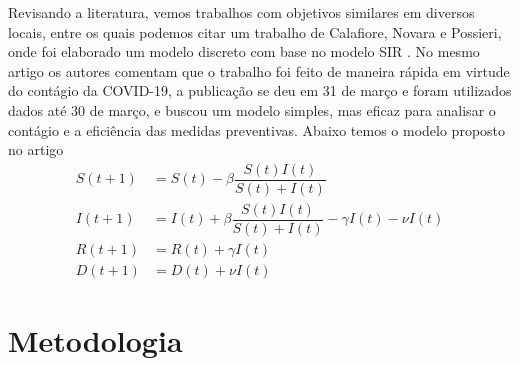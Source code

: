 \documentclass{article}
\begin{document}
Revisando a literatura, vemos trabalhos com objetivos similares em diversos locais, entre os quais podemos citar um trabalho de Calafiore, Novara e Possieri, onde foi elaborado um modelo discreto com base no modelo SIR \cite{calafiore2020modified}. No mesmo artigo os autores comentam que o trabalho foi feito de maneira rápida em virtude do contágio da COVID-19, a publicação se deu em 31 de março e foram utilizados dados até 30 de março, e buscou um modelo simples, mas eficaz para analisar o contágio e a eficiência das medidas preventivas. Abaixo temos o modelo proposto no artigo
\begin{equation*}
    \begin{split}
        S(t + 1) & = S(t) - \beta \dfrac{S(t) I(t)}{S(t) + I(t)} \\
        I(t + 1) & = I(t) + \beta \dfrac{S(t) I(t)}{S(t) + I(t)} - \gamma I(t) - \nu I(t) \\
        R(t + 1) & = R(t) + \gamma I(t) \\
        D(t + 1) & = D(t) + \nu I(t)
    \end{split}
\end{equation*}





\section{Metodologia}




\printbibliography
\end{document}
